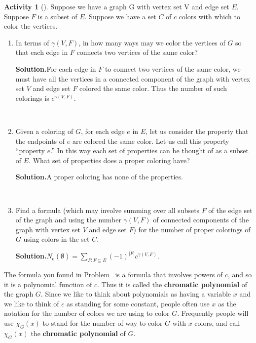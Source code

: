 \documentclass[10pt,]{book}
\newcommand{\terminology}[1]{\textbf{#1}}
\theoremstyle{plain}
\theoremstyle{definition}
\newtheorem{activity}[project]{Activity}
\numberwithin{equation}{chapter}
\begin{document}
\begin{activity}[]\label{activity-222}
Suppose we have a graph G with vertex set V and edge set \(E\). Suppose \(F\) is a subset of \(E\). Suppose we have a set \(C\) of \(c\) colors with which to color the vertices.%
~\par
\begin{enumerate}[label=(\alph*)]
 \item In terms of \(\gamma(V,F)\), in how many ways may we color the vertices of \(G\) so that each edge in \(F\) connects two vertices of the same color?%
\par\medskip\noindent%
\textbf{Solution.}\quad For each edge in \(F\) to connect two vertices of the same color, we must have all the vertices in a connected component of the graph with vertex set \(V\) and edge set \(F\) colored the same color. Thus the number of such colorings is \(c^{\gamma(V,F)}\).%

~\par
\item Given a coloring of \(G\), for each edge \(e\) in \(E\), let us consider the property that the endpoints of \(e\) are colored the same color.  Let us call this property ``property \(e\).''  In this way each set of properties can be thought of as a subset of \(E\).  What set of properties does a proper coloring have?%
\par\medskip\noindent%
\textbf{Solution.}\quad A proper coloring has none of the properties.%

~\par
\item Find a formula (which may involve summing over all subsets \(F\) of the edge set of the graph and using the number \(\gamma(V,F)\) of connected components of the graph with vertex set \(V\) and edge set \(F\)) for the number of proper colorings of \(G\) using colors in the set \(C\).%
\par\medskip\noindent%
\textbf{Solution.}\quad \(N_{\mbox{e} }(\emptyset)=\sum_{F:F\subseteq E}
(-1)^{|F|}c^{\gamma(V,F)}.\)%

\end{enumerate}
\end{activity}
The formula you found in \hyperref[chromaticpoly]{Problem~} is a formula that involves powers of \(c\), and so it is a polynomial function of \(c\). Thus it is called the \terminology{chromatic polynomial} of the graph \(G\). Since we like to think about polynomials as having a variable \(x\) and we like to think of \(c\) as standing for some constant, people often use \(x\) as the notation for the number of colors we are using to color \(G\). Frequently people will use \(\chi_G(x)\) to stand for the number of way to color \(G\) with \(x\) colors, and call \(\chi_G(x)\) the \terminology{chromatic polynomial} of \(G\).%
\end{document}
